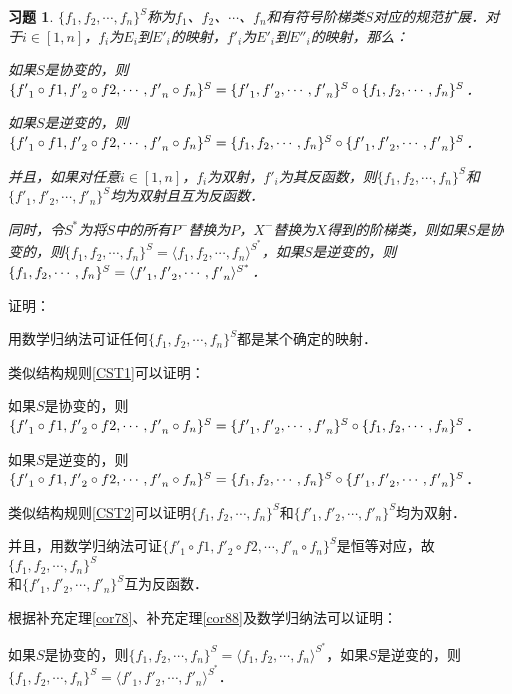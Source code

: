 \documentclass[12pt, a4paper, oneside]{book}
\newtheorem{exer}{习题}
\begin{document}
\begin{exer}
				\par
				$\{f_1, f_2, \cdots, f_n\}^S$称为$f_1$、$f_2$、$\cdots$、$f_n$和有符号阶梯类$S$对应的规范扩展．对于$i\in [1, n]$，$f_i$为$E_i$到${E'}_i$的映射，${f'}_i$为${E'}_i$到${E''}_i$的映射，那么：
				\par
				如果$S$是协变的，则$\{{f'}_1\circ f1, {f'}_2\circ f2, \cdots, {f'}_n\circ f_n\}^S=\{{f'}_1, {f'}_2, \cdots, {f'}_n\}^S\circ \\\{f_1, f_2, \cdots, f_n\}^S$．
				\par
				如果$S$是逆变的，则$\{{f'}_1\circ f1, {f'}_2\circ f2, \cdots, {f'}_n\circ f_n\}^S=\{f_1, f_2, \cdots, f_n\}^S\circ \\\{{f'}_1, {f'}_2, \cdots, {f'}_n\}^S$．
				\par
				并且，如果对任意$i\in [1, n]$，$f_i$为双射，${f'}_i$为其反函数，则$\{f_1, f_2, \cdots, f_n\}^S$和\\$\{{f'}_1, {f'}_2, \cdots, {f'}_n\}^S$均为双射且互为反函数．
				\par
				同时，令$S^*$为将$S$中的所有$P^-$替换为$P$，$X^-$替换为$X$得到的阶梯类，则如果$S$是协变的，则$\{f_1, f_2, \cdots, f_n\}^S=\langle f_1, f_2, \cdots, f_n\rangle^{S^*}$，如果$S$是逆变的，则$\{f_1, f_2, \cdots, f_n\}^S=\\\langle {f'}_1, {f'}_2, \cdots, {f'}_n\rangle^{S^*}$．
			\end{exer}
			证明：
			\par
			用数学归纳法可证任何$\{f_1, f_2, \cdots, f_n\}^S$都是某个确定的映射．
			\par
			类似结构规则\ref{CST1}可以证明：
			\par
			如果$S$是协变的，则$\{{f'}_1\circ f1, {f'}_2\circ f2, \cdots, {f'}_n\circ f_n\}^S=\{{f'}_1, {f'}_2, \cdots, {f'}_n\}^S\circ \\\{f_1, f_2, \cdots, f_n\}^S$．
			\par
			如果$S$是逆变的，则$\{{f'}_1\circ f1, {f'}_2\circ f2, \cdots, {f'}_n\circ f_n\}^S=\{f_1, f_2, \cdots, f_n\}^S\circ \\\{{f'}_1, {f'}_2, \cdots, {f'}_n\}^S$．
			\par
			类似结构规则\ref{CST2}可以证明$\{f_1, f_2, \cdots, f_n\}^S$和$\{{f'}_1, {f'}_2, \cdots, {f'}_n\}^S$均为双射．
			\par
			并且，用数学归纳法可证$\{{f'}_1\circ f1, {f'}_2\circ f2, \cdots, {f'}_n\circ f_n\}^S$是恒等对应，故$\{f_1, f_2, \cdots, f_n\}^S$\\和$\{{f'}_1, {f'}_2, \cdots, {f'}_n\}^S$互为反函数．
			\par
			根据补充定理\ref{cor78}、补充定理\ref{cor88}及数学归纳法可以证明：
			\par
			如果$S$是协变的，则$\{f_1, f_2, \cdots, f_n\}^S=\langle f_1, f_2, \cdots, f_n\rangle^{S^*}$，如果$S$是逆变的，则\\$\{f_1, f_2, \cdots, f_n\}^S=\langle {f'}_1, {f'}_2, \cdots, {f'}_n\rangle^{S^*}$．
			
\end{document}
